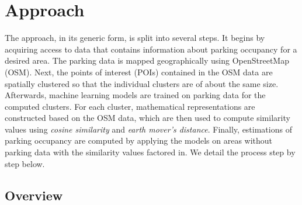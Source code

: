 	\section{Approach}
	The approach, in its generic form, is split into several steps. It begins by acquiring access to data that contains information about parking occupancy for a desired area. The parking data is mapped geographically using OpenStreetMap (OSM).
	Next, the points of interest (POIs) contained in the OSM data are spatially clustered so that the individual clusters are of about the same size. Afterwards, machine learning models are trained on parking data for the computed clusters. For each cluster, mathematical representations are constructed based on the OSM data, which are then used to compute similarity values using \textit{cosine similarity} and \textit{earth mover's distance}. Finally, estimations of parking occupancy are computed by applying the models on areas without parking data with the similarity values factored in.   
	We detail the process step by step below.
	
%	
	\subsection{Overview}	

